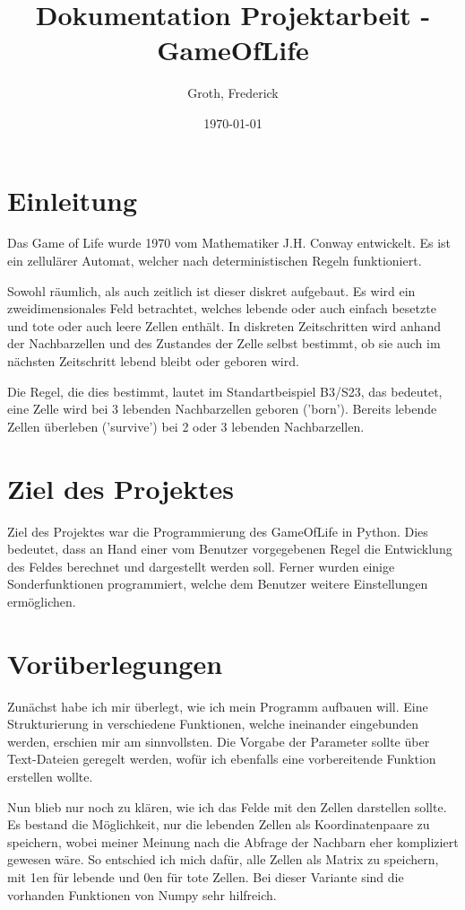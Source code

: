 \documentclass{scrartcl}
\begin{document}
\title{Dokumentation Projektarbeit - GameOfLife}
\author{Groth, Frederick}
\date{\today}
\maketitle
\newpage
\tableofcontents
\newpage
\section{Einleitung}
Das Game of Life wurde 1970 vom Mathematiker J.H. Conway entwickelt. Es ist ein zellulärer Automat, welcher nach deterministischen Regeln funktioniert.

Sowohl räumlich, als auch zeitlich ist dieser diskret aufgebaut. Es wird ein zweidimensionales Feld betrachtet, welches lebende oder auch einfach besetzte und tote oder auch leere Zellen enthält. In diskreten Zeitschritten wird anhand der Nachbarzellen und des Zustandes der Zelle selbst bestimmt, ob sie auch im nächsten Zeitschritt lebend bleibt oder geboren wird.

Die Regel, die dies bestimmt, lautet im Standartbeispiel B3/S23, das bedeutet, eine Zelle wird bei 3 lebenden Nachbarzellen geboren ('born'). Bereits lebende Zellen überleben ('survive') bei 2 oder 3 lebenden Nachbarzellen.
\section{Ziel des Projektes}
Ziel des Projektes war die Programmierung des GameOfLife in Python.
Dies bedeutet, dass an Hand einer vom Benutzer vorgegebenen Regel die Entwicklung des Feldes berechnet und dargestellt werden soll. Ferner wurden einige Sonderfunktionen programmiert, welche dem Benutzer weitere Einstellungen ermöglichen.
\section{Vorüberlegungen}
Zunächst habe ich mir überlegt, wie ich mein Programm aufbauen will. Eine Strukturierung in verschiedene Funktionen, welche ineinander eingebunden werden, erschien mir am sinnvollsten. Die Vorgabe der Parameter sollte über Text-Dateien geregelt werden, wofür ich ebenfalls eine vorbereitende Funktion erstellen wollte.

Nun blieb nur noch zu klären, wie ich das Felde mit den Zellen darstellen sollte. Es bestand die Möglichkeit, nur die lebenden Zellen als Koordinatenpaare zu speichern, wobei meiner Meinung nach die Abfrage der Nachbarn eher kompliziert gewesen wäre. So entschied ich mich dafür, alle Zellen als Matrix zu speichern, mit 1en für lebende und 0en für tote Zellen. Bei dieser Variante sind die vorhanden Funktionen von Numpy sehr hilfreich.
\end{document}
